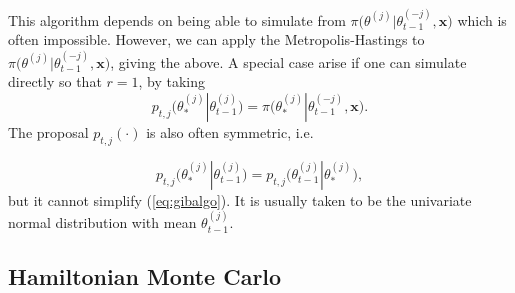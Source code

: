 This algorithm depends on being able to simulate from $\pi\Big(\theta^{(j)}|\theta_{t-1}^{(-j)},\boldsymbol{x}\Big)$ which is often impossible. However, we can apply the Metropolis-Hastings to $\pi\Big(\theta^{(j)}|\theta_{t-1}^{(-j)},\boldsymbol{x}\Big)$,
giving the above.
A special case arise if one can simulate directly so that $r=1$, by taking
\begin{equation*} p_{t,j}\big(\theta_*^{(j)}|\theta_{t-1}^{(j)}\big)=\pi\big(\theta_*^{(j)}|\theta_{t-1}^{(-j)},\boldsymbol{x}\big).
\end{equation*}
The proposal $p_{t,j}(\cdot)$ is also often symmetric, i.e.

\begin{equation*}
p_{t,j}\big(\theta_*^{(j)}|\theta_{t-1}^{(j)}\big)= p_{t,j}\big(\theta_{t-1}^{(j)}|\theta_*^{(j)}\big),
\end{equation*}
but it cannot simplify (\ref{eq:gibalgo}). It is usually taken to be the univariate normal distribution with mean $\theta_{t-1}^{(j)}$.





\subsection{Hamiltonian Monte Carlo}\label{app:hmc}


